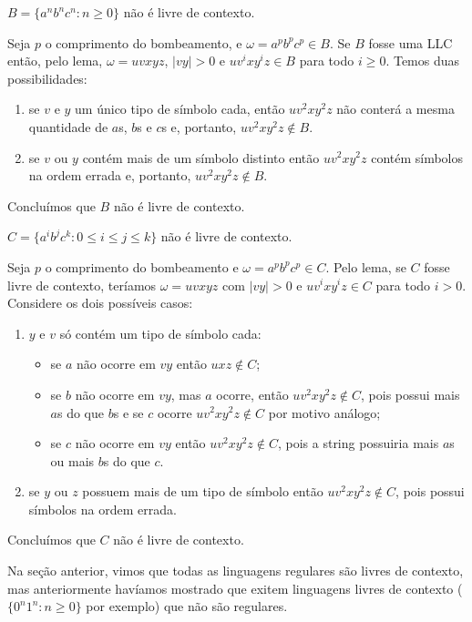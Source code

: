 \begin{example}
  $B = \{a^nb^nc^n : n \geq 0\}$ não é livre de contexto.

  Seja $p$ o comprimento do bombeamento, e $\omega = a^pb^pc^p \in B$.
  Se $B$ fosse uma LLC então, pelo lema, $\omega = uvxyz$, $|vy| > 0$ e $uv^ixy^iz \in B$ para todo $i \geq 0$.
  Temos duas possibilidades:
  \begin{enumerate}
  \item se $v$ e $y$ um único tipo de símbolo cada, então $uv^2xy^2z$ não conterá a mesma quantidade de $a$s, $b$s e $c$s e, portanto, $uv^2xy^2z \notin B$.
  \item se $v$ ou $y$ contém mais de um símbolo distinto então $uv^2xy^2z$ contém símbolos na ordem errada e, portanto, $uv^2xy^2z \notin B$.
  \end{enumerate}
  Concluímos que $B$ não é livre de contexto.
\end{example}

\begin{example}
  $C = \{a^ib^jc^k : 0 \leq i \leq j \leq k\}$ não é livre de contexto.

  Seja $p$ o comprimento do bombeamento e $\omega = a^pb^pc^p \in C$.
  Pelo lema, se $C$ fosse livre de contexto, teríamos $\omega = uvxyz$ com $|vy| > 0$ e $uv^ixy^iz \in C$ para todo $i > 0$.
  Considere os dois possíveis casos:

  \begin{enumerate}
  \item $y$ e $v$ só contém um tipo de símbolo cada:
    \begin{itemize}
    \item se $a$ não ocorre em $vy$ então $uxz \notin C$;
    \item se $b$ não ocorre em $vy$, mas $a$ ocorre, então $uv^2xy^2z \notin C$, pois possui mais $a$s do que $b$s e se $c$ ocorre $uv^2xy^2z \notin C$ por motivo análogo;
    \item se $c$ não ocorre em $vy$ então $uv^2xy^2z \notin C$, pois a string possuiria mais $a$s ou mais $b$s do que $c$.
    \end{itemize}
  \item se $y$ ou $z$ possuem mais de um tipo de símbolo então $uv^2xy^2z \notin C$, pois possui símbolos na ordem errada.
  \end{enumerate}
  Concluímos que $C$ não é livre de contexto.
\end{example}

Na seção anterior, vimos que todas as linguagens regulares são livres de contexto, mas anteriormente havíamos mostrado que exitem linguagens livres de contexto ($\{0^n1^n: n \geq 0\}$ por exemplo) que não são regulares.

